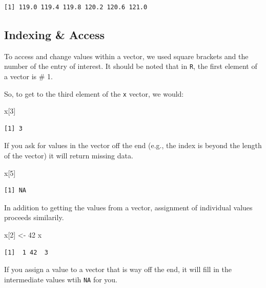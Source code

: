\documentclass[
  letterpaper,
]{book}
\newenvironment{Shaded}{\begin{snugshade}}{\end{snugshade}}
\newcommand{\DecValTok}[1]{\textcolor[rgb]{0.68,0.00,0.00}{#1}}
\newcommand{\NormalTok}[1]{\textcolor[rgb]{0.00,0.23,0.31}{#1}}
\newcommand{\OtherTok}[1]{\textcolor[rgb]{0.00,0.23,0.31}{#1}}
\begin{document}
\begin{verbatim}
[1] 119.0 119.4 119.8 120.2 120.6 121.0
\end{verbatim}

\subsection{Indexing \& Access}\label{indexing-access}

To access and change values within a vector, we used square brackets and
the number of the entry of interest. It should be noted that in
\texttt{R}, the first element of a vector is \# 1.

So, to get to the third element of the \texttt{x} vector, we would:

\begin{Shaded}
\begin{Highlighting}[]
\NormalTok{x[}\DecValTok{3}\NormalTok{]}
\end{Highlighting}
\end{Shaded}

\begin{verbatim}
[1] 3
\end{verbatim}

If you ask for values in the vector off the end (e.g., the index is
beyond the length of the vector) it will return missing data.

\begin{Shaded}
\begin{Highlighting}[]
\NormalTok{x[}\DecValTok{5}\NormalTok{]}
\end{Highlighting}
\end{Shaded}

\begin{verbatim}
[1] NA
\end{verbatim}

In addition to getting the values from a vector, assignment of
individual values proceeds similarily.

\begin{Shaded}
\begin{Highlighting}[]
\NormalTok{x[}\DecValTok{2}\NormalTok{] }\OtherTok{\textless{}{-}} \DecValTok{42}
\NormalTok{x}
\end{Highlighting}
\end{Shaded}

\begin{verbatim}
[1]  1 42  3
\end{verbatim}

If you assign a value to a vector that is way off the end, it will fill
in the intermediate values wtih \texttt{NA} for you.
\end{document}

